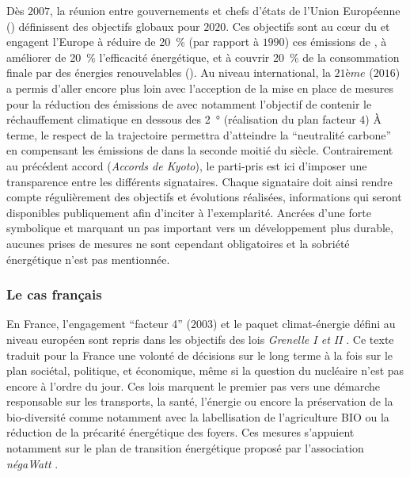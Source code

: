 Dès $2007$, la réunion entre gouvernements et chefs d’états de l’Union Européenne
() définissent des objectifs globaux pour $2020$. Ces objectifs sont au cœur du
et engagent l’Europe à réduire de \SI{20}{\percent} (par rapport à $1990$) ces
émissions de , à améliorer de \SI{20}{\percent} l’efficacité énergétique, et à
couvrir \SI{20}{\percent} de la consommation finale par des énergies renouvelables
(). Au niveau international, la $21ème$  ($2016$) a permis d’aller
encore plus loin avec l’acception de la mise en place de mesures pour la réduction des
émissions de  avec notamment l’objectif de contenir le réchauffement climatique
en dessous des \SI{2}{\degree} (réalisation du plan facteur $4$) À terme, le respect de la trajectoire
permettra d’atteindre la \enquote{neutralité carbone} en compensant les émissions de
 dans la seconde moitié du siècle. Contrairement au précédent accord
(\textit{Accords de Kyoto}), le parti-pris est ici d’imposer une transparence entre les
différents signataires. Chaque signataire doit ainsi rendre compte régulièrement des
objectifs et évolutions réalisées, informations qui seront disponibles publiquement afin
d’inciter à l’exemplarité. Ancrées d’une forte symbolique et marquant un pas important vers
un développement plus durable, aucunes prises de mesures ne sont cependant obligatoires et
la sobriété énergétique n’est pas mentionnée.


\subsubsection{Le cas français} %
\label{ssub:le_cas_francais}
En France, l’engagement \enquote{facteur 4} ($2003$) et le paquet climat-énergie défini
au niveau européen sont repris dans les objectifs des lois \textit{Grenelle I et II}
\parencite{Grenelle2010}. Ce texte traduit pour la France une volonté de décisions sur le
long terme à la fois sur le plan sociétal, politique, et économique, même si la question
du nucléaire n’est pas encore à l’ordre du jour. Ces lois marquent le premier pas vers une
démarche responsable sur les transports, la santé, l’énergie ou encore la préservation de
la bio-diversité comme notamment avec la labellisation de l’agriculture BIO ou la
réduction de la précarité énergétique des foyers. Ces mesures s’appuient notamment sur le
plan de transition énergétique proposé par l’association \textit{négaWatt}
\parencite{Salomon2012}.

